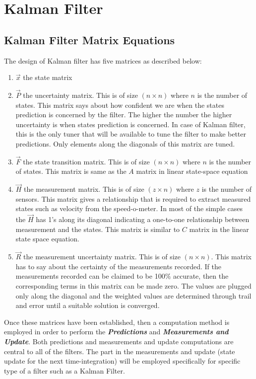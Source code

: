 \section{Kalman Filter}



\subsection{Kalman Filter Matrix Equations}

The design of Kalman filter has five matrices as described below:
\begin{enumerate}
	\item $\vec{x}$ the state matrix
	\item $\vec{P}$ the uncertainty matrix. This is of size $(n \times n)$ where $n$ is the number of states. This matrix says about how confident we are when the states prediction is concerned by the filter. The higher the number the higher uncertainty is when states prediction is concerned. In case of Kalman filter, this is the only tuner that will be available to tune the filter to make better predictions. Only elements along the diagonals of this matrix are tuned.
	\item $\vec{F}$ the state transition matrix. This is of size $(n \times n)$ where $n$ is the number of states. This matrix is same as the $A$ matrix in linear state-space equation 
	\item $\vec{H}$ the measurement matrix. This is of size $(z \times n)$ where $z$ is the number of sensors. This matrix gives a relationship that is required to extract measured states such as velocity from the speed-o-meter. In most of the simple cases the  $\vec{H}$ has 1's along its diagonal indicating a one-to-one relationship between measurement and the states. This matrix is similar to $C$ matrix in the linear state space equation.
	\item $\vec{R}$ the measurement uncertainty matrix. This is of size $(n \times n)$. This matrix has to say about the certainty of the measurements recorded. If the measurements recorded can be claimed to be 100$\%$ accurate, then the corresponding terms in this matrix can be made zero. The values are plugged only along the diagonal and the weighted values are determined through trail and error until a suitable solution is converged.  
\end{enumerate}

Once these matrices have been established, then a computation method is employed in order to perform the \textbf{\textit{Predictions}} and \textbf{\textit{Measurements and Update}}. Both predictions and measurements and update computations are central to all of the filters. The part in the measurements and update (state update for the next time-integration) will be employed specifically for specific type of a filter such as a Kalman Filter. 

